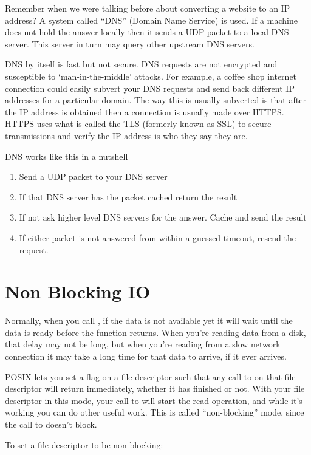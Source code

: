 Remember when we were talking before about converting a website to an IP address?
A system called ``DNS'' (Domain Name Service) is used.
If a machine does not hold the answer locally then it sends a UDP packet to a local DNS server.
This server in turn may query other upstream DNS servers.

DNS by itself is fast but not secure.
DNS requests are not encrypted and susceptible to `man-in-the-middle' attacks.
For example, a coffee shop internet connection could easily subvert your DNS requests and send back different IP addresses for a particular domain.
The way this is usually subverted is that after the IP address is obtained then a connection is usually made over HTTPS.
HTTPS uses what is called the TLS (formerly known as SSL) to secure transmissions and verify the IP address is who they say they are.

DNS works like this in a nutshell
\begin{enumerate}
  \tightlist
\item Send a UDP packet to your DNS server
\item If that DNS server has the packet cached return the result
\item If not ask higher level DNS servers for the answer. Cache and send the result
  \item If either packet is not answered from within a guessed timeout, resend the request.
\end{enumerate}

\section{Non Blocking IO}

Normally, when you call , if the data is not available yet it will wait until the data is ready before the function returns.
When you're reading data from a disk, that delay may not be long, but when you're reading from a slow network connection it may take a long time for that data to arrive, if it ever arrives.

POSIX lets you set a flag on a file descriptor such that any call to  on that file descriptor will return immediately, whether it has finished or not.
With your file descriptor in this mode, your call to  will start the read operation, and while it's working you can do other useful work.
This is called ``non-blocking'' mode, since the call to  doesn't block.

To set a file descriptor to be non-blocking:

